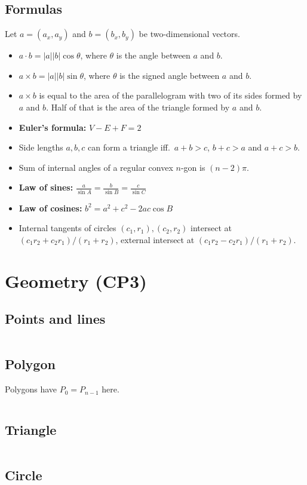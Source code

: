 \documentclass[8pt,a4paper,landscape,oneside]{amsart}
\newcommand{\mintedstyle}[2]{\inputminted[fontsize=\normalsize,baselinestretch=.9,breaklines,breakautoindent,tabsize=2]{#1}{code/#2}}
\newcommand{\code}[1]{\mintedstyle{cpp}{#1}}
\newenvironment{myitemize}
{\begin{itemize}[leftmargin=.3cm]
	\setlength{\itemsep}{0pt}
	\setlength{\parskip}{0pt}
	\setlength{\parsep}{0pt}     }
{ \end{itemize}                  }
\begin{document}
\begin{multicols*}{3}
\subsection{Formulas}
Let $a = (a_x, a_y)$ and $b = (b_x, b_y)$ be two-dimensional vectors.
\begin{myitemize}
	\item $a\cdot b = |a||b|\cos{\theta}$, where $\theta$ is the angle
		between $a$ and $b$.
	\item $a\times b = |a||b|\sin{\theta}$, where $\theta$ is the
		signed angle between $a$ and $b$.
	\item $a\times b$ is equal to the area of the parallelogram with
		two of its sides formed by $a$ and $b$. Half of that is the
		area of the triangle formed by $a$ and $b$.
	\item \textbf{Euler's formula:} $V - E + F = 2$
	\item Side lengths $a,b,c$ can form a triangle iff.\ $a+b>c$, $b+c>a$ and $a+c>b$.
	\item Sum of internal angles of a regular convex $n$-gon is $(n-2)\pi$.
	\item \textbf{Law of sines:} $\frac{a}{\sin A} = \frac{b}{\sin B} = \frac{c}{\sin C}$
	\item \textbf{Law of cosines:} $b^2 = a^2 + c^2 - 2ac\cos B$
	\item Internal tangents of circles $(c_1,r_1), (c_2,r_2)$ intersect at $(c_1r_2+c_2r_1)/(r_1+r_2)$, external intersect at $(c_1r_2-c_2r_1)/(r_1+r_2)$.
\end{myitemize}

\section{Geometry (CP3)}
\subsection{Points and lines}
\code{geometry/CP/points_lines.cpp}
\subsection{Polygon}
Polygons have $P_0 = P_{n-1}$ here.
\code{geometry/CP/polygon.cpp}
\subsection{Triangle}
\code{geometry/CP/triangles.cpp}
\subsection{Circle}
\code{geometry/CP/circles.cpp}


\end{multicols*}
\end{document}
